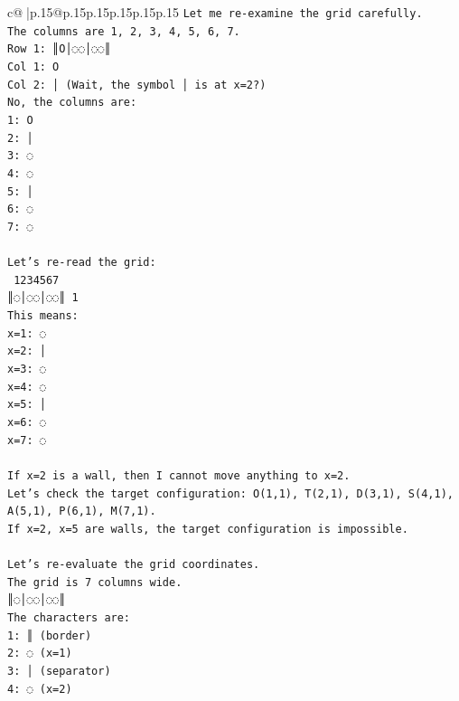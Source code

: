 \documentclass{article}
\begin{document}
{\begin{supertabular}{c@{$\;$}|p{.15\linewidth}@{}p{.15\linewidth}p{.15\linewidth}p{.15\linewidth}p{.15\linewidth}p{.15\linewidth}}
{{{\texttt{Let me re{-}examine the grid carefully.} \\
\texttt{The columns are 1, 2, 3, 4, 5, 6, 7.} \\
\texttt{Row 1: ║O│◌◌│◌◌║} \\
\texttt{Col 1: O} \\
\texttt{Col 2: │ (Wait, the symbol │ is at x=2?)} \\
\texttt{No, the columns are:} \\
\texttt{1: O} \\
\texttt{2: │} \\
\texttt{3: ◌} \\
\texttt{4: ◌} \\
\texttt{5: │} \\
\texttt{6: ◌} \\
\texttt{7: ◌} \\
\\ 
\texttt{Let's re{-}read the grid:} \\
\texttt{ 1234567} \\
\texttt{║◌│◌◌│◌◌║ 1} \\
\texttt{This means:} \\
\texttt{x=1: ◌} \\
\texttt{x=2: │} \\
\texttt{x=3: ◌} \\
\texttt{x=4: ◌} \\
\texttt{x=5: │} \\
\texttt{x=6: ◌} \\
\texttt{x=7: ◌} \\
\\ 
\texttt{If x=2 is a wall, then I cannot move anything to x=2.} \\
\texttt{Let's check the target configuration: O(1,1), T(2,1), D(3,1), S(4,1), A(5,1), P(6,1), M(7,1).} \\
\texttt{If x=2, x=5 are walls, the target configuration is impossible.} \\
\\ 
\texttt{Let's re{-}evaluate the grid coordinates.} \\
\texttt{The grid is 7 columns wide.} \\
\texttt{║◌│◌◌│◌◌║} \\
\texttt{The characters are:} \\
\texttt{1: ║ (border)} \\
\texttt{2: ◌ (x=1)} \\
\texttt{3: │ (separator)} \\
\texttt{4: ◌ (x=2)} \\
}}}
\end{supertabular}}
\end{document}
